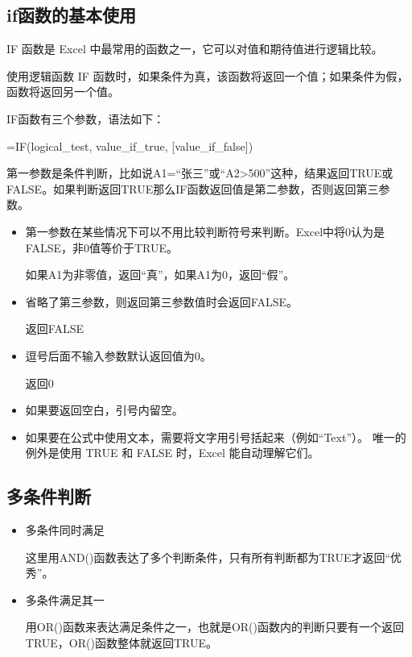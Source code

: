 \subsection{if函数的基本使用}

IF 函数是 Excel 中最常用的函数之一，它可以对值和期待值进行逻辑比较。

使用逻辑函数 IF 函数时，如果条件为真，该函数将返回一个值；如果条件为假，函数将返回另一个值。


IF函数有三个参数，语法如下：

=IF(logical\_test, value\_if\_true, [value\_if\_false])


第一参数是条件判断，比如说A1=``张三''或``A2>500''这种，结果返回TRUE或FALSE。如果判断返回TRUE那么IF函数返回值是第二参数，否则返回第三参数。

\begin{itemize}
    \item 第一参数在某些情况下可以不用比较判断符号来判断。Excel中将0认为是FALSE，非0值等价于TRUE。
    
    
    如果A1为非零值，返回``真''，如果A1为0，返回``假''。
    \item 省略了第三参数，则返回第三参数值时会返回FALSE。
    

    返回FALSE
    \item 逗号后面不输入参数默认返回值为0。
    

    返回0
    \item 如果要返回空白，引号内留空。
    
    
    \item 如果要在公式中使用文本，需要将文字用引号括起来（例如``Text''）。 唯一的例外是使用 TRUE 和 FALSE 时，Excel 能自动理解它们。
\end{itemize}

\subsection{多条件判断}

\begin{itemize}
    \item 多条件同时满足
    

    这里用AND()函数表达了多个判断条件，只有所有判断都为TRUE才返回``优秀''。
    \item 多条件满足其一
    

    用OR()函数来表达满足条件之一，也就是OR()函数内的判断只要有一个返回TRUE，OR()函数整体就返回TRUE。
\end{itemize}

